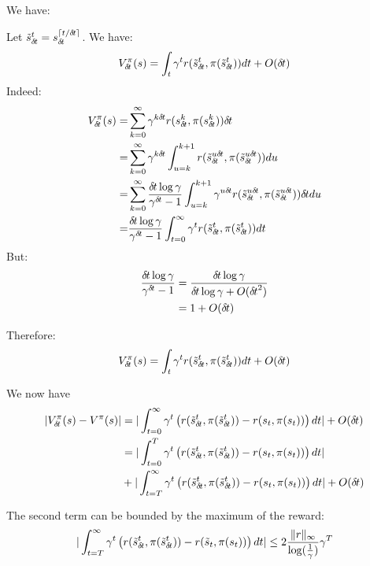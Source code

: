 
We have:

Let $\tilde s_{\delta\hspace{-.1em}t}^t = s_{\delta\hspace{-.1em}t}^{\lceil t/{\delta\hspace{-.1em}t}\rceil}$. We have:
\begin{align}
  V^\pi_{\delta\hspace{-.1em}t}(s) = \int_t \gamma^t r(\tilde s_{\delta\hspace{-.1em}t}^t, \pi(\tilde s_{\delta\hspace{-.1em}t}^t))dt + O({\delta\hspace{-.1em}t})
\end{align}
Indeed:
\begin{align}
  V^\pi_\deltat(s) =& \sum_{k=0}^\infty \gamma^{k\deltat}r(s_\deltat^k, \pi( s_\deltat^k))\deltat \\
  =& \sum_{k=0}^\infty \gamma^{k\deltat}\int_{u=k}^{k+1}r(\tilde s_\deltat^{u\deltat}, \pi( \tilde s_\deltat^{u\deltat}))du \\
  =& \sum_{k=0}^\infty \frac{\deltat \log \gamma}{\gamma^\deltat - 1}\int_{u=k}^{k+1}\gamma^{u\deltat}r(\tilde s_\deltat^{u\deltat}, \pi( \tilde s_\deltat^{u\deltat}))\deltat du \\
  =& \frac{\deltat \log \gamma}{\gamma^\deltat - 1}  \int_{t=0}^{\infty}\gamma^{t}r(\tilde s_\deltat^{t}, \pi( \tilde s_\deltat^{t}))dt \\
\end{align}
But:
\begin{align}
  \frac{{\delta\hspace{-.1em}t} \log \gamma}{\gamma^{\delta\hspace{-.1em}t} - 1} &= \frac{{\delta\hspace{-.1em}t} \log \gamma}{{\delta\hspace{-.1em}t} \log\gamma + O({\delta\hspace{-.1em}t}^2)} \\
  &= 1 +  O({\delta\hspace{-.1em}t}) \\
\end{align}

Therefore:
\begin{align}
  V^\pi_{\delta\hspace{-.1em}t}(s) = \int_t \gamma^t r(\tilde s_{\delta\hspace{-.1em}t}^t, \pi(\tilde s_{\delta\hspace{-.1em}t}^t))dt + O({\delta\hspace{-.1em}t})
\end{align}

We now have
\begin{align}
  |V^\pi_{\delta\hspace{-.1em}t}(s) - V^\pi(s)|  &= | \int_{t=0}^\infty\gamma^t \left(r(\tilde s_{\delta\hspace{-.1em}t}^t, \pi(\tilde s_{\delta\hspace{-.1em}t}^t)) - r(s_t, \pi(s_t)) \right)dt | + O({\delta\hspace{-.1em}t}) \\
				 &= | \int_{t=0}^T\gamma^t \left(r(\tilde s_{\delta\hspace{-.1em}t}^t, \pi(\tilde s_{\delta\hspace{-.1em}t}^t)) - r(s_t, \pi(s_t)) \right)dt | \\
				 &+ | \int_{t=T}^\infty\gamma^t \left(r(\tilde s_{\delta\hspace{-.1em}t}^t, \pi(\tilde s_{\delta\hspace{-.1em}t}^t)) - r(s_t, \pi(s_t)) \right)dt | + O({\delta\hspace{-.1em}t})
\end{align}

The second term can be bounded by the maximum of the reward:
\begin{align}
  | \int_{t=T}^\infty\gamma^t \left(r(\tilde s_{\delta\hspace{-.1em}t}^t, \pi(\tilde s_{\delta\hspace{-.1em}t}^t)) - r(\tilde s_t, \pi(s_t)) \right)dt | \leq 2 \frac{\|r\|_\infty}{\log(\frac{1}{\gamma})} \gamma^T
  \label{eq:v-firstpart}
\end{align}

